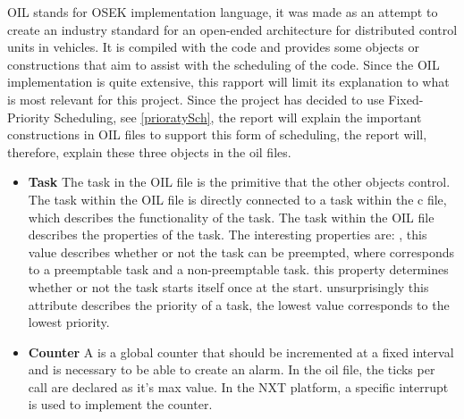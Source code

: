 OIL stands for OSEK implementation language, it was made as an attempt to create an industry standard for an open-ended architecture for distributed control units in vehicles\cite{OILManual}. It is compiled with the code and provides some objects or constructions that aim to assist with the scheduling of the code. Since the OIL implementation is quite extensive, this rapport will limit its explanation to what is most relevant for this project. Since the project has decided to use Fixed-Priority Scheduling, see \ref{prioratySch}, the report will explain the important constructions in OIL files to support this form of scheduling, the report will, therefore, explain these three objects in the oil files.

\begin{itemize}
    \item{\textbf{Task}}
    The task in the OIL file is the primitive that the other objects control. The task within the OIL file is directly connected to a task within the c file, which describes the functionality of the task. The task within the OIL file describes the properties of the task. The interesting properties are: , this value describes whether or not the task can be preempted, where  corresponds to a preemptable task and  a non-preemptable task.  this property determines whether or not the task starts itself once at the start. 
     unsurprisingly this attribute describes the priority of a task, the lowest value corresponds to the lowest priority.
    \item{\textbf{Counter}}
    A  is a global counter that should be incremented at a fixed interval and is necessary to be able to create an alarm. In the oil file, the ticks per call are declared as it's max value. In the NXT platform, a specific interrupt is used to implement the counter.
    

\end{itemize}
